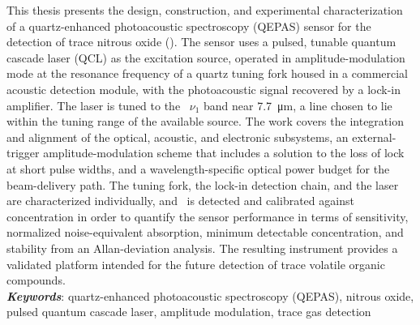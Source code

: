 \noindent
This thesis presents the design, construction, and experimental characterization of a quartz-enhanced photoacoustic spectroscopy (QEPAS) sensor for the detection of trace nitrous oxide (\nto). The sensor uses a pulsed, tunable quantum cascade laser (QCL) as the excitation source, operated in amplitude-modulation mode at the resonance frequency of a quartz tuning fork housed in a commercial acoustic detection module, with the photoacoustic signal recovered by a lock-in amplifier. The laser is tuned to the \nto\ $\nu_1$ band near \SI{7.7}{\micro\meter}, a line chosen to lie within the tuning range of the available source. The work covers the integration and alignment of the optical, acoustic, and electronic subsystems, an external-trigger amplitude-modulation scheme that includes a solution to the loss of lock at short pulse widths, and a wavelength-specific optical power budget for the beam-delivery path. The tuning fork, the lock-in detection chain, and the laser are characterized individually, and \nto\ is detected and calibrated against concentration in order to quantify the sensor performance in terms of sensitivity, normalized noise-equivalent absorption, minimum detectable concentration, and stability from an Allan-deviation analysis.  The resulting instrument provides a validated platform intended for the future detection of trace volatile organic compounds.
\\

\noindent
\textbf{\textit{Keywords}}: quartz-enhanced photoacoustic spectroscopy (QEPAS), nitrous oxide, pulsed quantum cascade laser, amplitude modulation, trace gas detection
